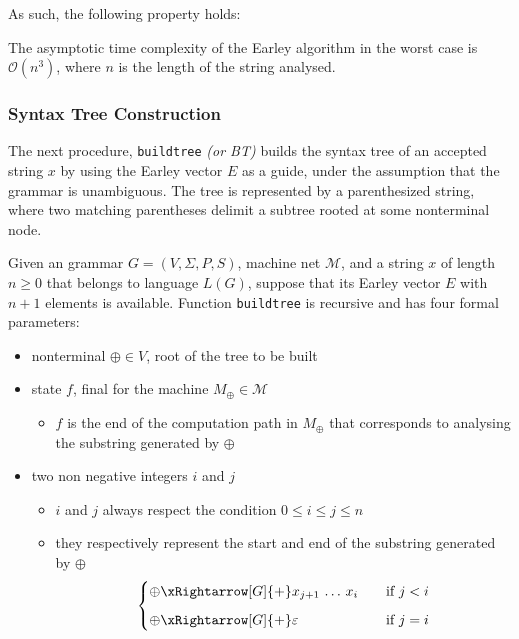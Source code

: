 As such, the following property holds:

\begin{property}
  The asymptotic time complexity of the Earley algorithm in the worst case is \(\mathcal{O}(n^3)\), where \(n\) is the length of the string analysed.
\end{property}

\subsubsection{Syntax Tree Construction}

The next procedure, \texttt{buildtree} \textit{(or BT)} builds the syntax tree of an accepted string \(x\) by using the Earley vector \(E\) as a guide, under the assumption that the grammar is unambiguous.
The tree is represented by a parenthesized string, where two matching parentheses delimit a subtree rooted at some nonterminal node.

Given an \EBNF grammar \(G = \left( V, \Sigma, P, S \right)\), machine net \(\mathcal{M}\), and a string \(x\) of length \(n \geq 0\) that belongs to language \(L(G)\), suppose that its Earley vector \(E\) with \(n+1\) elements is available.
Function \texttt{buildtree} is recursive and has four formal parameters:

\begin{itemize}
  \item nonterminal \(\oplus \in V\), root of the tree to be built
  \item state \(f\), final for the machine \(M_\oplus \in \mathcal{M}\)
        \begin{itemize}
          \item \(f\) is the end of the computation path in \(M_\oplus\) that corresponds to analysing the substring generated by \(\oplus\)
        \end{itemize}
  \item two non negative integers \(i\) and \(j\)
        \begin{itemize}
          \item \(i\) and \(j\) always respect the condition \(0 \leq i \leq j \leq n\)
          \item they respectively represent the start and end of the substring generated by \(\oplus\)
                \[ \begin{cases}
                    \oplus \xRightarrow[G]{+} x_{j+1} \,\ldots\, x_i \quad & \text{if} \ j < i \\[1.5ex]
                    \oplus \xRightarrow[G]{+} \varepsilon \quad            & \text{if} \ j = i \\
                  \end{cases}  \]
        \end{itemize}
\end{itemize}

